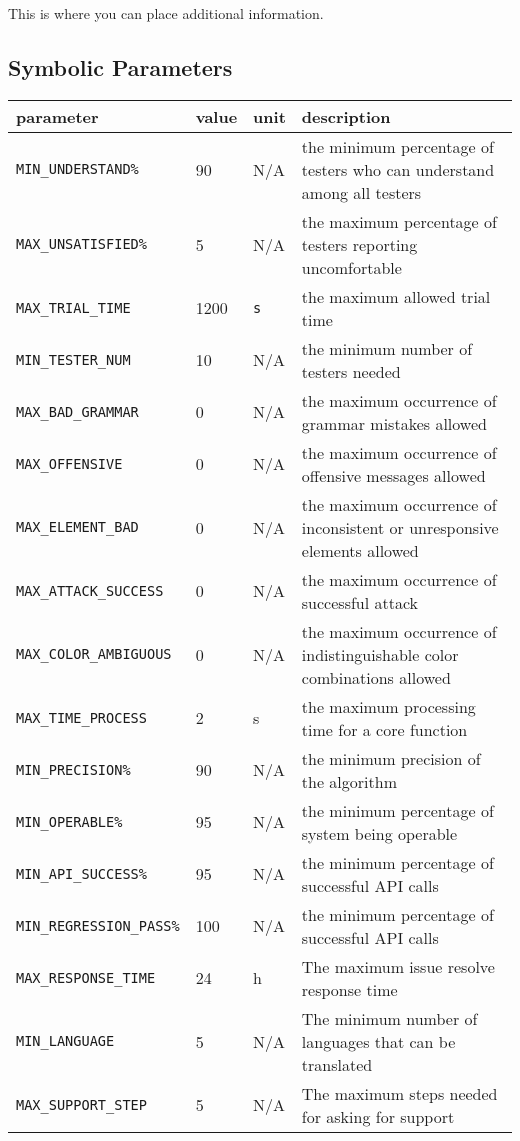 \documentclass[12pt, titlepage]{article}
\begin{document}
\begin{enumerate}
This is where you can place additional information.

\subsection{Symbolic Parameters}

\begin{longtable}{|l|l|l|p{5cm}|}

\hline
parameter & value & unit & description\\
\hline
\texttt{MIN\_UNDERSTAND\%}\label{MIN_UNDERSTAND} & 90 & N/A & the minimum percentage of testers who can understand among all testers\\
\hline
\texttt{MAX\_UNSATISFIED\%}\label{MAX_UNSATISFIED} & 5 & N/A & the maximum percentage of testers reporting uncomfortable\\
\hline
\texttt{MAX\_TRIAL\_TIME}\label{MAX_TRIAL_TIME} & 1200 & \texttt{s} & the maximum allowed trial time\\
\hline
\texttt{MIN\_TESTER\_NUM}\label{MIN_TESTER_NUM} &  10 & N/A & the minimum number of testers needed\\
\hline
\texttt{MAX\_BAD\_GRAMMAR}\label{MAX_BAD_GRAMMAR} & 0 & N/A & the maximum occurrence of grammar mistakes allowed \\
\hline
\texttt{MAX\_OFFENSIVE}\label{MAX_OFFENSIVE} & 0& N/A & the maximum occurrence of offensive messages allowed\\
\hline
\texttt{MAX\_ELEMENT\_BAD}\label{MAX_ELEMENT_BAD} & 0& N/A & the maximum occurrence of inconsistent 
 or unresponsive elements allowed\\
\hline
\texttt{MAX\_ATTACK\_SUCCESS}\label{MAX_ATTACK_SUCCESS} & 0& N/A & the maximum occurrence of successful attack\\
\hline
\texttt{MAX\_COLOR\_AMBIGUOUS}\label{MAX_COLOR_AMBIGUOUS} & 0& N/A & the maximum occurrence of indistinguishable color combinations allowed\\
\hline
\texttt{MAX\_TIME\_PROCESS}\label{MAX_TIME_PROCESS} & 2& s & the maximum processing time for a core function\\
\hline
\texttt{MIN\_PRECISION\%}\label{MIN_PRECISION} & 90 & N/A & the minimum precision of the algorithm\\
\hline
\texttt{MIN\_OPERABLE\%}\label{MIN_OPERABLE} & 95 & N/A & the minimum percentage of system being operable \\
\hline
\texttt{MIN\_API\_SUCCESS\%}\label{MIN_API_SUCCESS} & 95 & N/A &  the minimum percentage of successful API calls\\
\hline
\texttt{MIN\_REGRESSION\_PASS\%}\label{MIN_REGRESSION_PASS} & 100  & N/A &  the minimum percentage of successful API calls\\
\hline
\texttt{MAX\_RESPONSE\_TIME}\label{MAX_RESPONSE_TIME} & 24 & h & The maximum issue resolve response time\\
\hline
\texttt{MIN\_LANGUAGE}\label{MIN_LANGUAGE} & 5& N/A & The minimum number of languages that can be translated\\
\hline
\texttt{MAX\_SUPPORT\_STEP}\label{MAX_SUPPORT_STEP} & 5&N/A& The maximum steps needed for asking for support\\


\end{longtable}
\end{enumerate}
\end{document}
